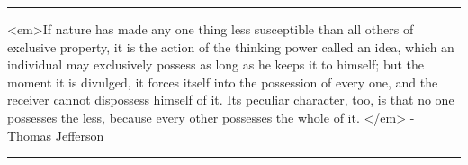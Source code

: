 \par\noindent\rule{\textwidth}{0.4pt}
<em>If nature has made any one thing less susceptible than all others 
 of exclusive property, it is the action of the thinking power called 
 an idea, which an individual may exclusively possess as long as he 
 keeps it to himself; but the moment it is divulged, it forces itself 
 into the possession of every one, and the receiver cannot dispossess 
 himself of it.  Its peculiar character, too, is that no one possesses 
 the less, because every other possesses the whole of it. </em> -
Thomas Jefferson

\par\noindent\rule{\textwidth}{0.4pt}


